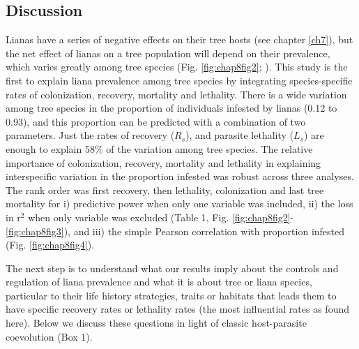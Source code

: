 \documentclass[b5paper,justified]{tufte-book} %
\begin{document}
\begin{fullwidth}
\section{Discussion}
Lianas have a series of negative effects on their tree hosts (see chapter \ref{ch7}), but the net effect of lianas on a tree population will depend on their prevalence, which varies greatly among tree species (Fig. \ref{fig:chap8fig2}; \citealt{Clark1990}). This study is the first to explain liana prevalence among tree species by integrating species-specific rates of colonization, recovery, mortality and lethality. There is a wide variation among tree species in the proportion of individuals infested by lianas (0.12 to 0.93), and this proportion can be predicted with a combination of two parameters. Just the rates of recovery ($R_s$), and parasite lethality ($L_s$) are enough to explain 58\% of the variation among tree species. The relative importance of colonization, recovery, mortality and lethality in explaining interspecific variation in the proportion infested was robust across three analyses. The rank order was first recovery, then lethality, colonization and last tree mortality for i) predictive power when only one variable was included, ii) the loss in r$^2$ when only variable was excluded (Table 1, Fig. \ref{fig:chap8fig2}-\ref{fig:chap8fig3}), and iii) the simple Pearson correlation with proportion infested (Fig. \ref{fig:chap8fig4}).  

The next step is to understand what our results imply about the controls and regulation of liana prevalence and what it is about tree or liana species, particular to their life history strategies, traits or habitats that leads them to have specific recovery rates or lethality rates (the most influential rates as found here). Below we discuss these questions in light of classic host-parasite coevolution (Box 1).  \vspace{0.3cm}

\end{fullwidth}
\end{document}
